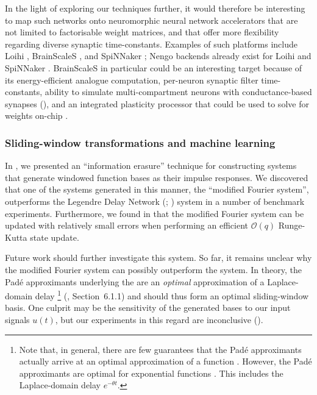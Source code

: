 In the light of exploring our techniques further, it would therefore be interesting to map such networks onto neuromorphic neural network accelerators that are not limited to factorisable weight matrices, and that offer more flexibility regarding diverse synaptic time-constants.
Examples of such platforms include Loihi \citep{davies2018loihi}, BrainScaleS \citep{schemmel2010waferscale}, and SpiNNaker \citep{painkras2013spinnaker}; Nengo backends already exist for Loihi and SpiNNaker \citep{mundy2015efficient,blouw2019benchmarking}.
BrainScaleS in particular could be an interesting target because of its energy-efficient analogue computation, per-neuron synaptic filter time-constants, ability to simulate multi-compartment \LIF neurons with conductance-based synapses (), and an integrated plasticity processor that could be used to solve for weights on-chip \citep{friedmann2017demonstrating}.

\subsubsection{Sliding-window transformations and machine learning}

In , we presented an \enquote{information erasure} technique for constructing \LTI systems that generate windowed function bases as their impulse responses.
We discovered that one of the systems generated in this manner, the \enquote{modified Fourier system}, outperforms the Legendre Delay Network (\LDN; \cite{voelker2018improving}) system in a number of benchmark experiments.
Furthermore, we found in  that the modified Fourier system can be updated with relatively small errors when performing an efficient $\mathcal{O}(q)$ Runge-Kutta state update.

Future work should further investigate this system.
So far, it remains unclear why the modified Fourier system can possibly outperform the \LDN system.
In theory, the Padé approximants underlying the \LDN are an \emph{optimal} approximation of a Laplace-domain delay%
\footnote{Note that, in general, there are few guarantees that the Padé approximants actually arrive at an optimal approximation of a function \citep[Section~5.12]{press2007numerical}. However, the Padé approximants are optimal for exponential functions \citep{borwein1983pade}.
This includes the Laplace-domain delay $e^{-\theta t}$.}
(\cite{voelker2019}, Section~6.1.1) and should thus form an optimal sliding-window basis.
One culprit may be the sensitivity of the generated bases to our input signals $u(t)$, but our experiments in this regard are inconclusive ().

